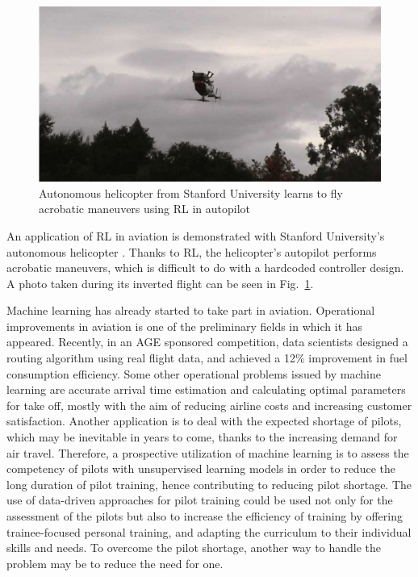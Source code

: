 \begin{figure}
\begin{center}
\includegraphics[width=13.1cm]{figures/invertedHelicopterAndrewNg}
\caption{Autonomous helicopter from Stanford University learns to fly acrobatic maneuvers using RL in autopilot \cite{ng2003shaping}} 
\label{fig:invertedHelicopterAndrewNg}
\end{center}
\end{figure}

An application of RL in aviation is demonstrated with Stanford University's autonomous helicopter \cite{ng2003shaping}. Thanks to RL, the helicopter's autopilot performs acrobatic maneuvers, which is difficult to do with a hardcoded controller design. A photo taken during its inverted flight can be seen in Fig.~\ref{fig:invertedHelicopterAndrewNg}.

Machine learning has already started to take part in aviation. Operational improvements in aviation is one of the preliminary fields in which it has appeared. Recently, in an AGE sponsored competition, data scientists designed a routing algorithm using real flight data, and achieved a 12\% improvement in fuel consumption efficiency. Some other operational problems issued by machine learning are accurate arrival time estimation and calculating optimal parameters for take off, mostly with the aim of reducing airline costs and increasing customer satisfaction. Another application is to deal with the expected shortage of pilots, which may be inevitable in years to come, thanks to the increasing demand for air travel. Therefore, a prospective utilization of machine learning is to assess the competency of pilots with unsupervised learning models in order to reduce the long duration of pilot training, hence contributing to reducing pilot shortage. The use of data-driven approaches for pilot training could be used not only for the assessment of the pilots but also to increase the efficiency of training by offering trainee-focused personal training, and adapting the curriculum to their individual skills and needs. To overcome the pilot shortage, another way to handle the problem may be to reduce the need for one. 

